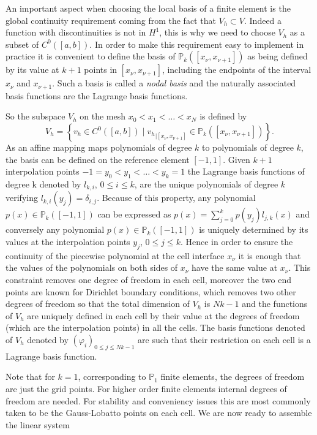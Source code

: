 An important aspect when choosing the local basis of a finite element is the global continuity requirement coming from the fact that $V_h \subset V$. Indeed a function with discontinuities is not in $H^1$, this is why we need to choose $V_h$ as a subset of $C^0([a,b])$. In order to make this requirement easy to implement in practice it is convenient to define the basis of $ \mathbb{P}_k([x_{\nu}, x_{\nu+1}])$ as being defined by its value at $k+1$ points in $[x_{\nu}, x_{\nu+1}]$, including the endpoints of the interval $x_\nu$ and $x_{\nu+1}$. Such a basis is called a \emph{nodal basis} and the naturally associated  basis functions are the Lagrange basis functions.

 So the subspace $V_h$ on the mesh $x_0<x_1<\dots < x_{N}$ is defined by
$$V_h = \left\{ v_h\in C^0([a,b]) \;|\; {v_h}_{|[x_\nu,x_{\nu+1}]}\in \mathbb{P}_k([x_\nu,x_{\nu+1}])\right\}.$$
As an affine mapping maps polynomials of degree $k$ to polynomials of degree $k$, the basis can be defined on the reference element $[-1,1]$.
 Given $k+1$ interpolation points $-1=y_0<y_1<\dots<y_k=1$ the Lagrange basis functions of degree k denoted by $l_{k,i}$, $0\leq i\leq k$, are the unique polynomials of degree $k$ verifying $l_{k,i}(y_j)=\delta_{i,j}$. Because of this property, any polynomial  $p(x)\in\mathbb{P}_k([-1,1])$ can be expressed as $p(x)=\sum_{j=0}^k p(y_j)l_{j,k}(x)$ and conversely any polynomial $p(x)\in\mathbb{P}_k([-1,1])$ is uniquely determined by its values at the interpolation points $y_j$, $0\leq j\leq k$. Hence in order to ensure the continuity of the piecewise polynomial at the cell interface $x_\nu$ it is enough that the values of the polynomials on both sides of $x_\nu$ have the same value at $x_\nu$. This constraint removes one degree of freedom in each cell, moreover the two end points are known for Dirichlet boundary conditions, which removes two other degrees of freedom so that the total dimension of $V_h$ is $Nk-1$ and the functions of  $V_h$ are uniquely defined in each cell by their value at the degrees of freedom (which are the interpolation points) in all the cells. The basis functions denoted of  $V_h$ denoted by $(\varphi_i)_{0\leq j\leq Nk-1}$ are such that their restriction on each cell is a Lagrange basis function.
 
 Note that for $k=1$, corresponding to $\mathbb{P}_1$ finite elements, the degrees of freedom are just  the grid points. For higher order finite elements internal degrees of freedom are needed. For stability and conveniency issues this are most commonly taken to be the Gauss-Lobatto points on each cell. We are now ready to assemble the linear system

